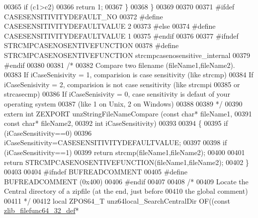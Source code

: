 \begin{DoxyCode}
00365         \textcolor{keywordflow}{if} (c1>c2)
00366             \textcolor{keywordflow}{return} 1;
00367     \}
00368 \}
00369 
00370 
00371 \textcolor{preprocessor}{#ifdef  CASESENSITIVITYDEFAULT\_NO}
00372 \textcolor{preprocessor}{#define CASESENSITIVITYDEFAULTVALUE 2}
00373 \textcolor{preprocessor}{#else}
00374 \textcolor{preprocessor}{#define CASESENSITIVITYDEFAULTVALUE 1}
00375 \textcolor{preprocessor}{#endif}
00376 
00377 \textcolor{preprocessor}{#ifndef STRCMPCASENOSENTIVEFUNCTION}
00378 \textcolor{preprocessor}{#define STRCMPCASENOSENTIVEFUNCTION strcmpcasenosensitive\_internal}
00379 \textcolor{preprocessor}{#endif}
00380 
00381 \textcolor{comment}{/*}
00382 \textcolor{comment}{   Compare two filename (fileName1,fileName2).}
00383 \textcolor{comment}{   If iCaseSenisivity = 1, comparision is case sensitivity (like strcmp)}
00384 \textcolor{comment}{   If iCaseSenisivity = 2, comparision is not case sensitivity (like strcmpi}
00385 \textcolor{comment}{                                                                or strcasecmp)}
00386 \textcolor{comment}{   If iCaseSenisivity = 0, case sensitivity is defaut of your operating system}
00387 \textcolor{comment}{        (like 1 on Unix, 2 on Windows)}
00388 \textcolor{comment}{}
00389 \textcolor{comment}{*/}
00390 \textcolor{keyword}{extern} \textcolor{keywordtype}{int} ZEXPORT unzStringFileNameCompare (\textcolor{keyword}{const} \textcolor{keywordtype}{char}*  fileName1,
00391                                                  \textcolor{keyword}{const} \textcolor{keywordtype}{char}*  fileName2,
00392                                                  \textcolor{keywordtype}{int} iCaseSensitivity)
00393 
00394 \{
00395     \textcolor{keywordflow}{if} (iCaseSensitivity==0)
00396         iCaseSensitivity=CASESENSITIVITYDEFAULTVALUE;
00397 
00398     \textcolor{keywordflow}{if} (iCaseSensitivity==1)
00399         \textcolor{keywordflow}{return} strcmp(fileName1,fileName2);
00400 
00401     \textcolor{keywordflow}{return} STRCMPCASENOSENTIVEFUNCTION(fileName1,fileName2);
00402 \}
00403 
00404 \textcolor{preprocessor}{#ifndef BUFREADCOMMENT}
00405 \textcolor{preprocessor}{#define BUFREADCOMMENT (0x400)}
00406 \textcolor{preprocessor}{#endif}
00407 
00408 \textcolor{comment}{/*}
00409 \textcolor{comment}{  Locate the Central directory of a zipfile (at the end, just before}
00410 \textcolor{comment}{    the global comment)}
00411 \textcolor{comment}{*/}
00412 local ZPOS64\_T unz64local\_SearchCentralDir OF((\textcolor{keyword}{const} \hyperlink{structzlib__filefunc64__32__def__s}{zlib\_filefunc64\_32\_def}* 

\end{DoxyCode}
